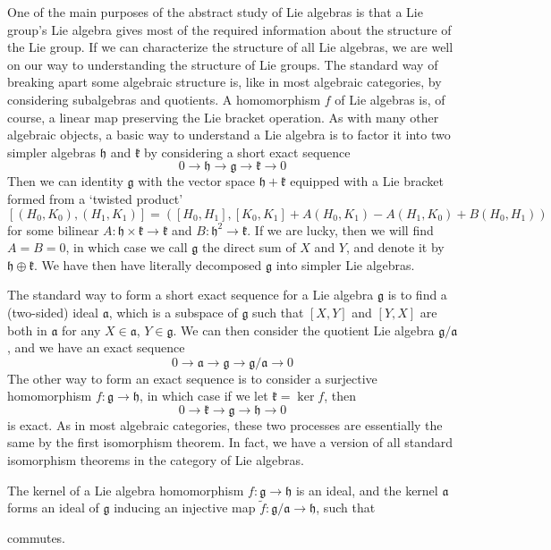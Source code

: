 One of the main purposes of the abstract study of Lie algebras is that a Lie group's Lie algebra gives most of the required information about the structure of the Lie group. If we can characterize the structure of all Lie algebras, we are well on our way to understanding the structure of Lie groups. The standard way of breaking apart some algebraic structure is, like in most algebraic categories, by considering subalgebras and quotients. A homomorphism $f$ of Lie algebras is, of course, a linear map preserving the Lie bracket operation. As with many other algebraic objects, a basic way to understand a Lie algebra is to factor it into two simpler algebras $\mathfrak{h}$ and $\mathfrak{k}$ by considering a short exact sequence
%
\[ 0 \to \mathfrak{h} \to \mathfrak{g} \to \mathfrak{k} \to 0 \]
%
Then we can identity $\mathfrak{g}$ with the vector space $\mathfrak{h} + \mathfrak{k}$ equipped with a Lie bracket formed from a `twisted product'
%
\[ [(H_0,K_0), (H_1,K_1)] = \left([H_0,H_1], [K_0,K_1] + A(H_0,K_1) - A(H_1,K_0) + B(H_0,H_1) \right) \]
%
for some bilinear $A: \mathfrak{h} \times \mathfrak{k} \to \mathfrak{k}$ and $B: \mathfrak{h}^2 \to \mathfrak{k}$. If we are lucky, then we will find $A = B = 0$, in which case we call $\mathfrak{g}$ the direct sum of $X$ and $Y$, and denote it by $\mathfrak{h} \oplus \mathfrak{k}$. We have then have literally decomposed $\mathfrak{g}$ into simpler Lie algebras.

The standard way to form a short exact sequence for a Lie algebra $\mathfrak{g}$ is to find a (two-sided) ideal $\mathfrak{a}$, which is a subspace of $\mathfrak{g}$ such that $[X,Y]$ and $[Y,X]$ are both in $\mathfrak{a}$ for any $X \in \mathfrak{a}$, $Y \in \mathfrak{g}$. We can then consider the quotient Lie algebra $\mathfrak{g}/\mathfrak{a}$, and we have an exact sequence
%
\[ 0 \to \mathfrak{a} \to \mathfrak{g} \to \mathfrak{g}/\mathfrak{a} \to 0 \]
%
The other way to form an exact sequence is to consider a surjective homomorphism $f: \mathfrak{g} \to \mathfrak{h}$, in which case if we let $\mathfrak{k} = \ker f$, then
%
\[ 0 \to \mathfrak{k} \to \mathfrak{g} \to \mathfrak{h} \to 0 \]
%
is exact. As in most algebraic categories, these two processes are essentially the same by the first isomorphism theorem. In fact, we have a version of all standard isomorphism theorems in the category of Lie algebras.

\begin{theorem}
    The kernel of a Lie algebra homomorphism $f: \mathfrak{g} \to \mathfrak{h}$ is an ideal, and the kernel $\mathfrak{a}$ forms an ideal of $\mathfrak{g}$ inducing an injective map $\tilde{f}: \mathfrak{g}/\mathfrak{a} \to \mathfrak{h}$, such that
    \begin{center}
    \end{center}
    commutes.
\end{theorem}

